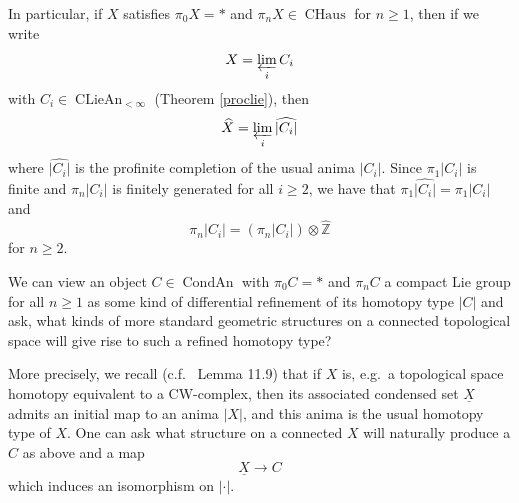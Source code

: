 \documentclass[12pt]{article}
\theoremstyle{definition}
\newcommand{\on}{\operatorname}
\newcommand{\mbb}{\mathbb}
\newcommand{\wh}{\widehat}
\newcommand{\ul}{\underline}
\begin{document}
In particular, if $X$ satisfies $\pi_0X=\ast$ and $\pi_nX\in\on{CHaus}$ for $n\geq 1$, then if we write
$$X = \varprojlim_i C_i$$
with $C_i\in \on{CLieAn}_{<\infty}$ (Theorem \ref{proclie}), then
$$\wh{X} = \varprojlim_i \wh{|C_i|}$$
where $\wh{|C_i|}$ is the profinite completion of the usual anima $|C_i|$.  Since $\pi_1|C_i|$ is finite and $\pi_n|C_i|$ is finitely generated for all $i\geq 2$, we have that $\pi_1\wh{|C_i|}=\pi_1|C_i|$ and
$$\pi_n\wh{|C_i|} = (\pi_n|C_i|)\otimes\wh{\mbb{Z}}$$
for $n\geq 2$.


We can view an object $C\in\on{CondAn}$ with $\pi_0C=\ast$ and $\pi_nC$ a compact Lie group for all $n\geq 1$ as some kind of differential refinement of its homotopy type $|C|$ and ask, what kinds of more standard geometric structures on a connected topological space will give rise to such a refined homotopy type?

More precisely, we recall (c.f.\ \cite{scholzeanalytic} Lemma 11.9) that if $X$ is, e.g.\ a topological space homotopy equivalent to a CW-complex, then its associated condensed set $\ul{X}$ admits an initial map to an anima $|X|$, and this anima is the usual homotopy type of $X$.  One can ask what structure on a connected $X$ will naturally produce a $C$ as above and a map
$$\ul{X} \to C $$
which induces an isomorphism on $|\cdot|$.
\end{document}
